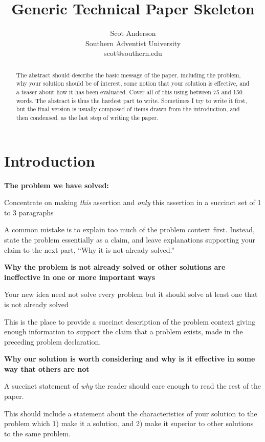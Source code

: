 \documentclass[pdf,bookmarks,colorlinks=true]{IEEEtran}
\title{\bf Generic Technical Paper Skeleton}
\author{Scot Anderson\\
Southern Adventist University\\
scot@southern.edu
}
\begin{document}
\maketitle

\begin{abstract}

The abstract should describe the basic message of the paper, including the problem, why your solution should be of interest, some notion that your solution is effective, and a teaser about how it has been evaluated. Cover all of this using between 75 and 150 words. The abstract is thus the hardest part to write. Sometimes I try to write it first, but the final version is usually composed of items drawn from the introduction, and then condensed, as the last step of writing the paper.

\end{abstract}

\section{Introduction}
\label{sec:Introduction}

\textbf{The problem we have solved:}

Concentrate on making {\em this} assertion and {\em only} this assertion in a succinct set of 1 to 3 paragraphs

A common mistake is to explain too much of the problem context first. Instead, state the problem essentially as a claim, and leave explanations supporting your claim to the next part, ``Why it is not already solved.''


\textbf{Why the problem is not already solved or other solutions are ineffective in one or more important ways}

Your new idea need not solve every problem but it should solve at least one that is not already solved

This is the place to provide a succinct description of the problem context giving enough information to support the claim that a problem exists, made in the preceding problem declaration.

\textbf{Why our solution is worth considering and why is it effective in some way that others are not}

A succinct statement of {\em why} the reader should care enough to read the rest of the paper.

This should include a statement about the characteristics of your solution to the problem which 1) make it a solution, and 2) make it superior to other solutions to the same problem.
\end{document}
